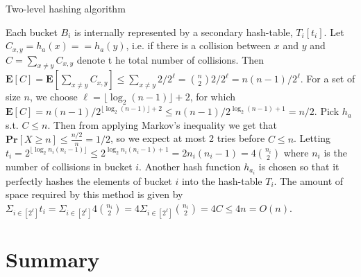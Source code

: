 \documentclass[12pt]{article}
\begin{document}
\begin{algorithm}[H]
 \caption{Two-level hashing algorithm}
\end{algorithm}

Each bucket $B_i$ is internally represented by a secondary hash-table, $T_i[t_i]$. Let $C_{x,y} = h_a(x) == h_a(y)$, i.e. if there is a collision between $x$ and $y$ and $C = \sum_{x \neq y} C_{x,y}$ denote t he total number of collisions. Then $\mathbf{E} \left[ C \right] = \mathbf{E}\left[ \sum_{x \neq y} C_{x,y} \right] \leq \sum_{x \neq y} 2/2^{\ell} = \binom{n}{2}2/2^\ell = n(n-1)/2^\ell$. For a set of size $n$, we choose $\ell = \lfloor \log_2(n-1) \rfloor + 2$, for which $\mathbf{E}[C] = n(n-1)/2^{\lfloor \log_2(n-1) \rfloor + 2} \leq n(n-1)/2^{\log_2(n-1) + 1} = n/2$. Pick $h_a$ s.t. $C \leq n$. Then from applying Markov's inequality we get that $\mathbf{Pr}[X \geq n] \leq \frac{n/2}{n} = 1/2$, so we expect at most 2 tries before $C \leq n$. Letting $t_i = 2^{\lfloor \log_2 n_i(n_i-1) \rfloor} \leq 2^{\log_2 n_i(n_i-1)+1} = 2n_i(n_i-1) = 4 \binom{n_i}{2}$ where $n_i$ is the number of collisions in bucket $i$. Another hash function $h_{a_i}$ is chosen so that it perfectly hashes the elements of bucket $i$ into the hash-table $T_i$. The amount of space required by this method is given by $\Sigma_{i \in [2^\ell]}t_i = \Sigma_{i \in [2^\ell]} 4 \binom{n_i}{2} = 4 \Sigma_{i \in [2^\ell]} \binom{n_i}{2} = 4C \leq 4n = O(n)$.

\pagebreak

\section*{Summary}
\end{document}
